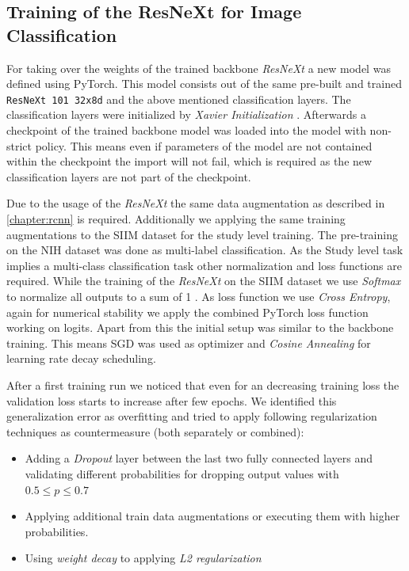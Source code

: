 \subsection*{Training of the ResNeXt for Image Classification}
For taking over the weights of the trained backbone \textit{ResNeXt} a new model was defined using PyTorch. This model consists out of the same pre-built and trained \texttt{ResNeXt 101 32x8d} and the above mentioned classification layers. The classification layers were initialized by \textit{Xavier Initialization} \autocite{glorot2010understanding}. Afterwards a checkpoint of the trained backbone model was loaded into the model with non-strict policy. This means even if parameters of the model are not contained within the checkpoint the import will not fail, which is required as the new classification layers are not part of the checkpoint.

Due to the usage of the \textit{ResNeXt} the same data augmentation as described in \ref{chapter:rcnn} is required. Additionally we applying the same training augmentations to the SIIM dataset for the study level training. The pre-training on the NIH dataset was done as multi-label classification. As the Study level task implies a multi-class classification task other normalization and loss functions are required. While the training of the \textit{ResNeXt} on the SIIM dataset we use \textit{Softmax} to normalize all outputs to a sum of 1 \autocite{goodfellow2016deep}. As loss function we use \textit{Cross Entropy}, again for numerical stability we apply the combined PyTorch loss function working on logits. Apart from this the initial setup was similar to the backbone training. This means \ac{SGD} was used as optimizer and \textit{Cosine Annealing} for learning rate decay scheduling. 

After a first training run we noticed that even for an decreasing training loss the validation loss starts to increase after few epochs. We identified this generalization error as overfitting and tried to apply following regularization techniques as countermeasure (both separately or combined):
\begin{itemize}
	\item Adding a \textit{Dropout} layer between the last two fully connected layers and validating different probabilities for dropping output values with $0.5 \leq p \leq 0.7$
	\item Applying additional train data augmentations or executing them with higher probabilities.
	\item Using \textit{weight decay} to applying \textit{L2 regularization}
\end{itemize}

